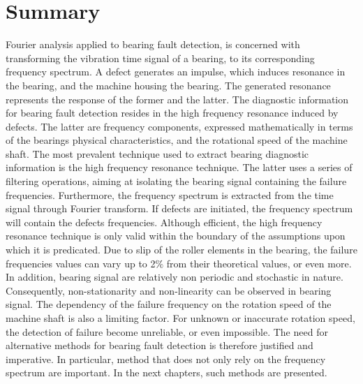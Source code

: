 \documentclass[../Main/thesis.tex]{subfiles}
\begin{document}
\section{Summary}
\label{sec:chapter_conclusion}
Fourier analysis applied to bearing fault detection, is concerned with transforming the vibration time signal of a bearing, to its corresponding frequency spectrum. A defect generates an impulse, which induces resonance in the bearing, and the machine housing the bearing. The generated resonance represents the response of the former and the latter.
\justify
The diagnostic information for bearing fault detection resides in the high frequency resonance induced by defects. The latter are frequency components, expressed mathematically in terms of the bearings physical characteristics, and the rotational speed of the machine shaft. The most prevalent technique used to extract bearing diagnostic information is the high frequency resonance technique.
\justify
The latter uses a series of filtering operations, aiming at isolating the bearing signal containing the failure frequencies. Furthermore, the frequency spectrum is extracted from the time signal through Fourier transform. If defects are initiated, the frequency spectrum will contain the defects frequencies. Although efficient, the high frequency resonance technique is only valid within the boundary of the assumptions upon which it is predicated. 
\justify
Due to slip of the roller elements in the bearing, the failure frequencies values can vary up to 2$\%$ from their theoretical values, or even more. In addition, bearing signal are relatively non periodic and stochastic in nature. Consequently, non-stationarity and non-linearity can be observed in bearing signal. The dependency of the failure frequency on the rotation speed of the machine shaft is also a limiting factor. For unknown or inaccurate rotation speed, the detection of failure become unreliable, or even impossible. The need for alternative methods for bearing fault detection is therefore justified and imperative. In particular, method that does not only rely on the frequency spectrum are important. In the next chapters, such methods are presented.



















\blankpage
\end{document}
